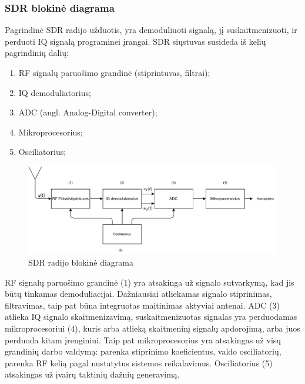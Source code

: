 \documentclass[main.tex]{subfiles}
\begin{document}
\subsubsection{SDR blokinė diagrama}

Pagrindinė SDR radijo užduotis, yra demoduliuoti signalą, jį suskaitmenizuoti, ir perduoti
IQ signalą programinei įrangai. SDR siųstuvas susideda iš kelių pagrindinių dalių:

\begin{enumerate}
    \item RF signalų paruošimo grandinė (stiprintuvas, filtrai);
    \item IQ demoduliatorius;
    \item ADC (angl. Analog-Digital converter);
    \item Mikroprocesorius;
    \item Osciliatorius;
\end{enumerate}

\begin{figure}[h]
    \begin{centering}
    \includegraphics[scale=0.85]{drawings/sdr_blockdiagram}
    \par\end{centering}
    \protect\caption{\label{fig:sdr_blockdiagram}SDR radijo blokinė diagrama}
\end{figure}

RF signalų paruošimo grandinė (1) yra atsakinga už signalo sutvarkymą, kad jis
būtų tinkamas demoduliacijai. Dažniausiai atliekamas signalo stiprinimas,
filtravimas, taip pat būna integruotas maitinimas aktyviai antenai. ADC (3) atlieka IQ
signalo skaitmenizavimą, suskaitmenizuotas signalas yra perduodamas mikroprocesoriui (4),
kuris arba atlieką skaitmeninį signalų apdorojimą, arba juos perduoda kitam įrenginiui.
Taip pat mikroprocesorius yra atsakingas už visų grandinių darbo valdymą: parenka stiprinimo
koeficientus, valdo osciliatorių, parenka RF kelią pagal nustatytus sistemos reikalavimus.
Osciliatorius (5) atsakingas už įvairų taktinių dažnių generavimą.
\end{document}
